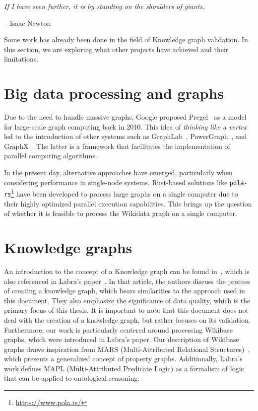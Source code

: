 \epigraph{\textit{If I have seen further, it is by standing on the shoulders of giants.}}{-- \textup{Isaac Newton}}

Some work has already been done in the field of Knowledge graph validation. In this section, we are exploring what other projects have achieved and their limitations.

\section{Big data processing and graphs}

Due to the need to handle massive graphs, Google proposed Pregel~\cite{10.1145/1807167.1807184} as a model for large-scale graph computing back in 2010. This idea of \textit{thinking like a vertex} led to the introduction of other systems such as GraphLab~\cite{10.14778/2212351.2212354}, PowerGraph~\cite{180251}, and GraphX~\cite{186216}. The latter is a framework that facilitates the implementation of parallel computing algorithms.

In the present day, alternative approaches have emerged, particularly when considering performance in single-node systems. Rust-based solutions like \texttt{pola-rs}\footnote{\url{https://www.pola.rs/}} have been developed to process large graphs on a single computer due to their highly optimized parallel execution capabilities. This brings up the question of whether it is feasible to process the Wikidata graph on a single computer.

\section{Knowledge graphs}

An introduction to the concept of a Knowledge graph can be found in~\cite{10.1145/3447772}, which is also referenced in Labra's paper~\cite{https://doi.org/10.48550/arxiv.2110.11709}. In that article, the authors discuss the process of creating a knowledge graph, which bears similarities to the approach used in this document. They also emphasize the significance of data quality, which is the primary focus of this thesis. It is important to note that this document does not deal with the creation of a knowledge graph, but rather focuses on its validation. Furthermore, our work is particularly centered around processing Wikibase graphs, which were introduced in Labra's paper. Our description of Wikibase graphs draws inspiration from MARS (Multi-Attributed Relational Structures)~\cite{ijcai2017p165}, which presents a generalized concept of property graphs. Additionally, Labra's work defines MAPL (Multi-Attributed Predicate Logic) as a formalism of logic that can be applied to ontological reasoning.

